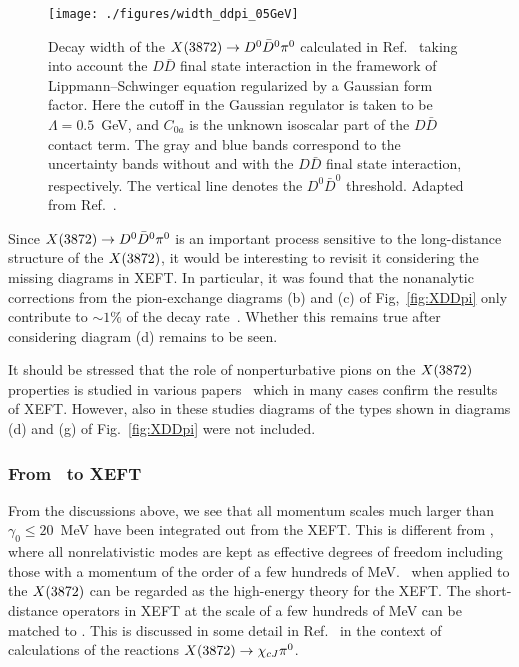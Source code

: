 \begin{figure}[tb]
  \begin{center}
   \texttt{[image: ./figures/width\_ddpi\_05GeV]}\\
   \caption{Decay width of the $X(3872)\to D^0\bar D^0\pi^0$ calculated in 
Ref.~\cite{Guo:2014hqa} taking into account the $D\bar D$ final state 
interaction in the framework of Lippmann--Schwinger equation regularized by a 
Gaussian form factor. Here the cutoff in the Gaussian regulator is taken to be 
$\Lambda=0.5$~GeV, and $C_{0a}$ is the unknown isoscalar part of the $D\bar D$ 
contact term. The gray and blue bands correspond to the uncertainty bands 
without and with the $D\bar D$ final state interaction, respectively. The 
vertical line denotes the $D^0\bar D^0$ threshold. Adapted from 
Ref.~\cite{Guo:2014hqa}. 
   \label{fig:XDDpi_FSI}}
  \end{center}
\end{figure}

Since $X(3872)\to D^0\bar D^0\pi^0$ is an important process sensitive to 
the long-distance structure of the $X(3872)$, it would be interesting to revisit it 
considering the missing diagrams in XEFT. In particular, it was found that the 
nonanalytic corrections from the pion-exchange diagrams (b) and (c) of Fig,~\ref{fig:XDDpi} only 
contribute to $\sim1\%$ of the decay rate~\cite{Fleming:2007rp}. Whether this 
remains true after considering diagram (d) remains to be seen.

It should be stressed that the role of nonperturbative pions on the $X(3872)$ 
properties is studied in various
papers~\cite{Baru:2011rs,Baru:2013rta,Baru:2016iwj} which in many cases 
confirm the results of XEFT. However, also in these studies diagrams of the 
types shown in diagrams (d) and (g) of Fig.~\ref{fig:XDDpi} were not included.

\subsubsection{From \nreft~to XEFT}
\label{sec:4-nreft2xeft}

From the discussions above, we see that all momentum scales much larger than 
$\gamma_0\leq20$~MeV have been integrated out from the XEFT. This is different 
from \nreft, where all nonrelativistic modes are kept as effective degrees 
of freedom including those with a momentum of the order of a few hundreds of 
MeV. \nreft~when applied to the $X(3872)$ can be regarded as the high-energy theory 
for the XEFT. The short-distance operators in XEFT at the scale of a few 
hundreds of MeV can be matched to \nreft. This is
discussed in some detail in Ref.~\cite{Mehen:2015efa} in the context of 
calculations of the reactions $X(3872)\to\chi_{cJ}\pi^0$.

